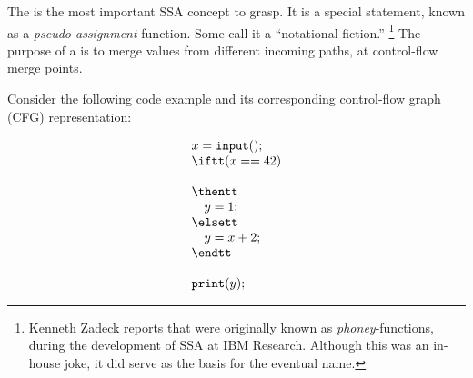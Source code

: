 The \phifun\index{\phifun} is the most important SSA concept to grasp.
It is a special statement, known as a
\textit{pseudo-assignment} function.
Some call it a ``notational fiction.''
\footnote{
%
%
Kenneth Zadeck reports that \phifuns were originally
known as \textit{phoney}-functions, during the development
of SSA at IBM Research. Although this was an in-house joke,
it did serve as the basis for the eventual name.
}
The purpose of a \phifun{} is to merge
values from different incoming paths, at control-flow
merge points.

Consider the following code example and its corresponding control-flow graph (CFG) representation:
\smallskip

\begin{minipage}{0.35\textwidth}%
\begin{equation*}
\begin{array}{l}
x = \texttt{input}();\\
\iftt (x == 42)\\
\\
\thentt\\
\quad    y = 1;\\
\elsett\\
\quad    y = x+2;\\
\endtt\\
\\
\texttt{print}(y);%
\end{array}%
\end{equation*}%
\end{minipage}
\begin{minipage}{0.5\textwidth}%
\strut
\end{minipage}
\bigskip


